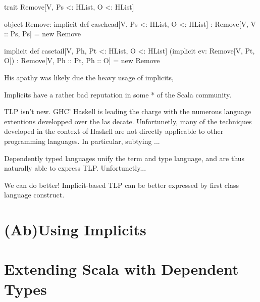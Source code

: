\memImplicitRemoveCodeSection
trait Remove[V, Ps <: HList, O <: HList]

object Remove:
  implicit def casehead[V, Ps <: HList, O <: HList]
    : Remove[V, V :: Ps, Ps] = new Remove {}

  implicit def casetail[V, Ph, Pt <: HList, O <: HList]
    (implicit ev: Remove[V, Pt, O])
    : Remove[V, Ph :: Pt, Ph :: O] = new Remove {}



His apathy was likely due the heavy usage of implicits,

Implicits have a rather bad reputation in some * of the Scala community.


TLP isn't new. GHC' Haskell is leading the charge with the numerous language extentions developped over the las decate. Unfortunetly, many of the techniques developed in the context of Haskell are not directly applicable to other programming languages. In particular, subtying ...

Dependently typed languages unify the term and type language, and are thus naturally able to express TLP. Unfortunetly...

We can do better! Implicit-based TLP can be better expressed by first class language construct.




\lipsum[1]

\chapter{(Ab)Using Implicits}
\label{chap:ab-using-implicits}
\lipsum[1]

\chapter{Extending Scala with Dependent Types}
\label{chap:extending-scala-with-dependent-types}
\lipsum[1]

